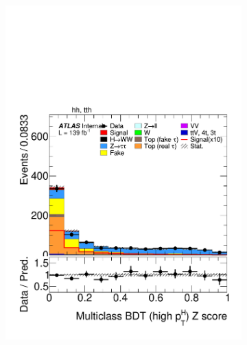 \begin{figure}[!htbp]
  \begin{subfigure}[b]{0.495\textwidth}
    \centering
    \includegraphics[width=\linewidth]{images/plots_overtrain_gt200/plot_tth_Z_multiclass_gt200_hh_tth.pdf}


\end{subfigure}
\end{figure}
